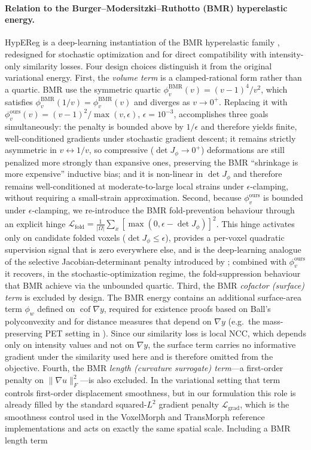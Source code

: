\documentclass[jimaging,article,submit,pdftex,moreauthors]{Definitions/mdpi}
\begin{document}
\paragraph{Relation to the Burger--Modersitzki--Ruthotto (BMR) hyperelastic energy.}
HypEReg is a deep-learning instantiation of the BMR hyperelastic family \cite{burger2013hyperelastic}, redesigned for stochastic optimization and for direct compatibility with intensity-only similarity losses. Four design choices distinguish it from the original variational energy. First, the \emph{volume term} is a clamped-rational form rather than a quartic. BMR use the symmetric quartic \(\phi^{\mathrm{BMR}}_v(v)=(v-1)^4/v^2\), which satisfies \(\phi^{\mathrm{BMR}}_v(1/v)=\phi^{\mathrm{BMR}}_v(v)\) and diverges as \(v\to 0^+\). Replacing it with \(\phi^{\mathrm{ours}}_v(v)=(v-1)^2/\max(v,\epsilon)\), \(\epsilon=10^{-3}\), accomplishes three goals simultaneously: the penalty is bounded above by \(1/\epsilon\) and therefore yields finite, well-conditioned gradients under stochastic gradient descent; it remains strictly asymmetric in \(v\leftrightarrow 1/v\), so compressive (\(\det J_\phi\to 0^+\)) deformations are still penalized more strongly than expansive ones, preserving the BMR ``shrinkage is more expensive'' inductive bias; and it is non-linear in \(\det J_\phi\) and therefore remains well-conditioned at moderate-to-large local strains under \(\epsilon\)-clamping, without requiring a small-strain approximation. Second, because \(\phi^{\mathrm{ours}}_v\) is bounded under \(\epsilon\)-clamping, we re-introduce the BMR fold-prevention behaviour through an explicit hinge \(\mathcal{L}_{\mathrm{fold}}=\frac{1}{|\Omega|}\sum_x[\max(0,\epsilon-\det J_\phi)]^2\). This hinge activates only on candidate folded voxels (\(\det J_\phi\le\epsilon\)), provides a per-voxel quadratic supervision signal that is zero everywhere else, and is the deep-learning analogue of the selective Jacobian-determinant penalty introduced by \citet{mok2020fast}; combined with \(\phi^{\mathrm{ours}}_v\) it recovers, in the stochastic-optimization regime, the fold-suppression behaviour that BMR achieve via the unbounded quartic. Third, the BMR \emph{cofactor (surface) term} is excluded by design. The BMR energy contains an additional surface-area term \(\phi_w\) defined on \(\operatorname{cof}\nabla y\), required for existence proofs based on Ball's polyconvexity and for distance measures that depend on \(\nabla y\) (e.g.\ the mass-preserving PET setting in \citet{burger2013hyperelastic}). Since our similarity loss is local NCC, which depends only on intensity values and not on \(\nabla y\), the surface term carries no informative gradient under the similarity used here and is therefore omitted from the objective. Fourth, the BMR \emph{length (curvature surrogate) term}---a first-order penalty on \(\|\nabla u\|_F^2\)---is also excluded. In the variational setting that term controls first-order displacement smoothness, but in our formulation this role is already filled by the standard squared-\(L^2\) gradient penalty \(\mathcal{L}_{\mathrm{grad}}\), which is the smoothness control used in the VoxelMorph and TransMorph reference implementations and acts on exactly the same spatial scale. Including a BMR length term 
\end{document}

